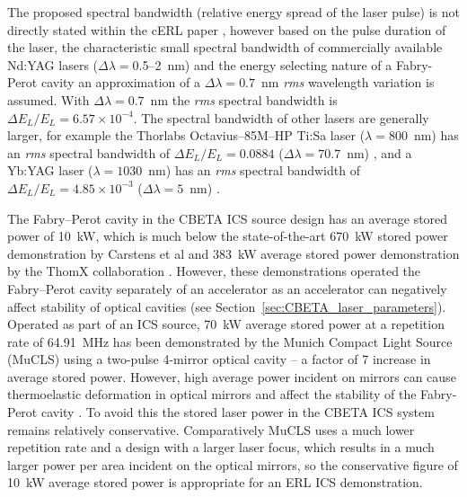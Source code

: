 \documentclass[../main.tex]{subfiles}
\begin{document}
The proposed spectral bandwidth (relative energy spread of the laser pulse) is not directly stated within the cERL paper \cite{akagi2016narrow}, however based on the pulse duration of the laser, the characteristic small spectral bandwidth of commercially available Nd:YAG lasers \cite{thorlabs2021ndyag450,thorlabs2021ndyag200} ($\Delta\lambda=$0.5--2~\si{\nano\meter}) and the energy selecting nature of a Fabry-Perot cavity an approximation of a $\Delta \lambda = 0.7$~\si{\nano\meter} \cite{corner2019personal} \textit{rms} wavelength variation is assumed. With $\Delta\lambda = 0.7$~\si{\nano\meter} the \textit{rms} spectral bandwidth is $\Delta E_{L}/E_{L}=6.57\times 10^{-4}$. The spectral bandwidth of other lasers are generally larger, for example the Thorlabs Octavius--85M--HP Ti:Sa laser ($\lambda = 800$~\si{\nano\meter}) has an \textit{rms} spectral bandwidth of $\Delta E_{L}/E_{L} = 0.0884$ ($\Delta\lambda=70.7$~\si{\nano\meter}) \cite{thorlabs2021tisa}, and a Yb:YAG laser ($\lambda=1030$~\si{\nano\meter}) has an \textit{rms} spectral bandwidth of $\Delta E_{L}/E_{L} = 4.85\times 10^{-3}$ ($\Delta\lambda=5$~\si{\nano\meter}) \cite{thorlabs2021ybyag}. 

The Fabry--Perot cavity in the CBETA ICS source design has an average stored power of 10~\si{\kilo\watt}, which is much below the state-of-the-art 670~\si{\kilo\watt} stored power demonstration by Carstens et al \cite{carstens2014megawatt} and 383~\si{\kilo\watt} average stored power demonstration by the ThomX collaboration \cite{liu2018optical}. However, these demonstrations operated the Fabry--Perot cavity separately of an accelerator as an accelerator can negatively affect stability of optical cavities (see Section~\ref{sec:CBETA_laser_parameters}). Operated as part of an ICS source, 70~\si{\kilo\watt} average stored power at a repetition rate of 64.91~\si{\mega\hertz} has been demonstrated by the Munich Compact Light Source (MuCLS) \cite{eggl2016munich} using a two-pulse 4-mirror optical cavity -- a factor of 7 increase in average stored power. However, high average power incident on mirrors can cause thermoelastic deformation in optical mirrors and affect the stability of the Fabry-Perot cavity \cite{chaikovska2016high}. To avoid this the stored laser power in the CBETA ICS system remains relatively conservative. Comparatively MuCLS uses a much lower repetition rate and a design with a larger laser focus, which results in a much larger power per area incident on the optical mirrors, so the conservative figure of 10~\si{\kilo\watt} average stored power is appropriate for an ERL ICS demonstration.   
\end{document}
